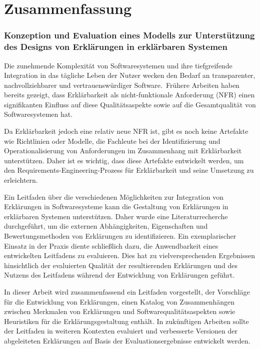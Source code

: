 \chapter*{Zusammenfassung}

\subsection*{Konzeption und Evaluation eines Modells zur Unterstützung des Designs von Erklärungen in erklärbaren Systemen}

Die zunehmende Komplexität von Softwaresystemen und ihre tiefgreifende Integration in das tägliche Leben der Nutzer wecken den Bedarf an transparenter, nachvollziehbarer und vertrauenswürdiger Software. Frühere Arbeiten haben bereits gezeigt, dass Erklärbarkeit als nicht-funktionale Anforderung (NFR) einen signifikanten Einfluss auf diese Qualitätsaspekte sowie auf die Gesamtqualität von Softwaresystemen hat.

Da Erklärbarkeit jedoch eine relativ neue NFR ist, gibt es noch keine Artefakte wie Richtlinien oder Modelle, die Fachleute bei der Identifizierung und Operationalisierung von Anforderungen im Zusammenhang mit Erklärbarkeit unterstützen. Daher ist es wichtig, dass diese Artefakte entwickelt werden, um den Requirements-Engineering-Prozess für Erklärbarkeit und seine Umsetzung zu erleichtern.

Ein Leitfaden über die verschiedenen Möglichkeiten zur Integration von Erklärungen in Softwaresysteme kann die Gestaltung von Erklärungen in erklärbaren Systemen unterstützen. Daher wurde eine Literaturrecherche durchgeführt, um die externen Abhängigkeiten, Eigenschaften und Bewertungsmethoden von Erklärungen zu identifizieren. Ein exemplarischer Einsatz in der Praxis diente schließlich dazu, die Anwendbarkeit eines entwickelten Leitfadens zu evaluieren. Dies hat zu vielversprechenden Ergebnissen hinsichtlich der evaluierten Qualität der resultierenden Erklärungen und des Nutzens des Leitfadens während der Entwicklung von Erklärungen geführt.

In dieser Arbeit wird zusammenfassend ein Leitfaden vorgestellt, der Vorschläge für die Entwicklung von Erklärungen, einen Katalog von Zusammenhängen zwischen Merkmalen von Erklärungen und Softwarequalitätsaspekten sowie Heuristiken für die Erklärungsgestaltung enthält. In zukünftigen Arbeiten sollte der Leitfaden in weiteren Kontexten evaluiert und verbesserte Versionen der abgeleiteten Erklärungen auf Basis der Evaluationsergebnisse entwickelt werden.


